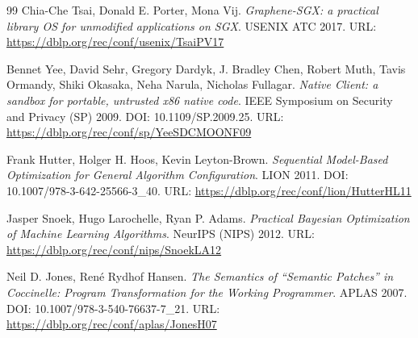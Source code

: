 \documentclass[UTF8,a4paper,12pt]{ctexart}
\numberwithin{equation}{section}
\begin{document}
\begin{thebibliography}{99}
 Chia-Che Tsai, Donald E. Porter, Mona Vij. \emph{Graphene-SGX:
a practical library OS for unmodified applications on SGX}. USENIX ATC
2017. URL: \url{https://dblp.org/rec/conf/usenix/TsaiPV17}

 Bennet Yee, David Sehr, Gregory Dardyk, J. Bradley Chen, Robert
Muth, Tavis Ormandy, Shiki Okasaka, Neha Narula, Nicholas Fullagar.
\emph{Native Client: a sandbox for portable, untrusted x86 native code}.
IEEE Symposium on Security and Privacy (SP) 2009. DOI:
10.1109/SP.2009.25. URL:
\url{https://dblp.org/rec/conf/sp/YeeSDCMOONF09}

 Frank Hutter, Holger H. Hoos, Kevin Leyton-Brown.
\emph{Sequential Model-Based Optimization for General Algorithm
Configuration}. LION 2011. DOI: 10.1007/978-3-642-25566-3\_40. URL:
\url{https://dblp.org/rec/conf/lion/HutterHL11}

 Jasper Snoek, Hugo Larochelle, Ryan P. Adams. \emph{Practical
Bayesian Optimization of Machine Learning Algorithms}. NeurIPS (NIPS)
2012. URL: \url{https://dblp.org/rec/conf/nips/SnoekLA12}

 Neil D. Jones, René Rydhof Hansen. \emph{The Semantics of
``Semantic Patches'' in Coccinelle: Program Transformation for the
Working Programmer}. APLAS 2007. DOI: 10.1007/978-3-540-76637-7\_21.
URL: \url{https://dblp.org/rec/conf/aplas/JonesH07}
\end{thebibliography}
\end{document}
